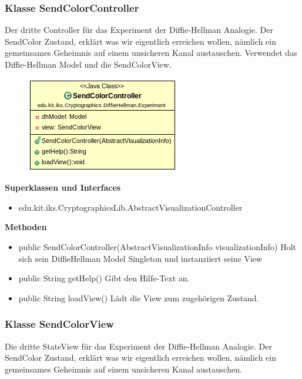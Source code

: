 \documentclass{article}
\begin{document}
\subsubsection{Klasse SendColorController}
      Der dritte Controller für das Experiment der Diffie-Hellman Analogie.
      Der SendColor Zustand, erklärt was wir eigentlich erreichen wollen,
      nämlich ein gemeinsames Geheimnis auf einem unsicheren Kanal austauschen.
      Verwendet das Diffie-Hellman Model und die SendColorView.

      \begin{figure}[H]
        \centering
        \includegraphics{resources/edu-kit-iks-Cryptographics-DiffieHellman-Experiment-SendColorController}
      \end{figure}

      \textbf{Superklassen und Interfaces}
      \begin{itemize}
        \item edu.kit.iks.CryptographicsLib.AbstractVisualizationController
      \end{itemize}

      \textbf{Methoden}
      \begin{itemize}
          \item public SendColorController(AbstractVisualizationInfo visualizationInfo) \newline
              Holt sich sein DiffieHellman Model Singleton und instanziiert seine View
        \item public String getHelp() \newline
        Gibt den Hilfe-Text an.
        \item public String loadView() \newline
        Lädt die View zum zugehörigen Zustand.
      \end{itemize}

\subsubsection{Klasse SendColorView}
      Die dritte StateView für das Experiment der Diffie-Hellman Analogie.
      Der SendColor Zustand, erklärt was wir eigentlich erreichen wollen,
      nämlich ein gemeinsames Geheimnis auf einem unsicheren Kanal austauschen.
\end{document}
